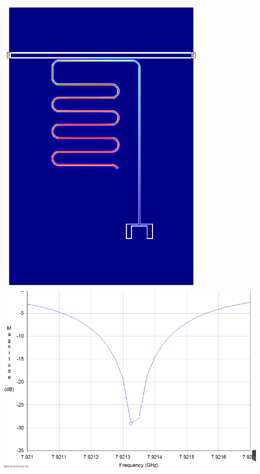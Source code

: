 \documentclass[aspectratio=169, 13pt]{beamer}
\begin{document}
\begin{frame}[c]
{	\vspace{0.5cm}
	\begin{columns}[c]
	\centering
	\includegraphics[height=0.7\textheight]{xmonres_sim_claw}
	\centering
	\includegraphics[width=\textwidth]{xmonres_sim_noclaw_res}
	\end{columns}
}

\end{frame}
\end{document}
